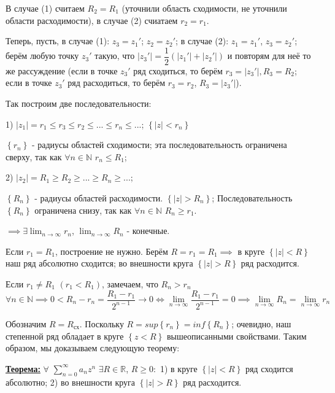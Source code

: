 \documentclass[a4paper, 12pt]{article}
\begin{document}
  \quad В случае (1) считаем $R_2 = R_1$ (уточнили область сходимости, не уточнили области расходимости), в случае (2) счиатаем $r_2 = r_1$. 

  \quad Теперь, пусть, в случае (1): $z_3 = z_1 '$; $z_2 = z_2 '$; в случае (2): $z_1 = z_1 '$, $z_3 = z_2 '$; берём любую точку $z_3 '$ такую, что $|z_3 '| = \dfrac{1}{2} \left( |z_1 '| + |z_2 '| \right)$ и повторям для неё то же рассуждение (если в точке $z_3 '$ ряд сходиться, то берём $r_3 = |z_3 '|, R_3 = R_2$; если в точке $z_3'$ ряд расходиться, то берём $r_3 = r_2$, $R_3 = |z_3 '|$). 
  
  \quad Так построим две последовательности:

  1) $|z_1| = r_1 \leq r_3 \leq r_2 \leq ... \leq r_n \leq ...$; $\left\{ |z| < r_n \right\}$

  $\left\{ r_n \right\}$ - радиусы областей сходимости; эта последовательность ограничена сверху, так как $\forall n \in \mathbb{N}$ $r_n \leq R_1$;

  2) $|z_2| = R_1 \geq R_2 \geq ... \geq R_n \geq ... $;

  $\left\{ R_n \right\}$ - радиусы областей расходимости. $\left\{|z| > R_n \right\}$; Последовательность $\left\{ R_n \right\}$ ограничена снизу, так как $\forall n \in \mathbb{N}$ $R_n \geq r_1$. 

  $\implies \exists \displaystyle\lim_{n \to \infty} r_n$, $\displaystyle\lim_{n \to \infty} R_n$ - конечные.
  
  \quad Если $r_1 = R_1$, построение не нужно. Берём $R = r_1 = R_1 \implies $ в круге $\left\{ |z| < R \right\}$ наш ряд абсолютно сходится; во внешности круга $\left\{ |z| > R \right\}$ ряд расходится. 

  \quad Если $r_1 \neq R_1$ $(r_1 < R_1)$, замечаем, что $R_n > r_n$ $\forall n \in \mathbb{N} \implies 0 < R_n - r_n = \dfrac{R_1 - r_1}{2^{n-1}} \to 0 \Leftrightarrow \lim\limits_{n \to \infty} \dfrac{R_1 - r_1}{2^{n-1}} = 0 \implies \lim\limits_{n \to \infty} R_n = \lim\limits_{n \to \infty} r_n $

  \quad Обозначим $R = R_{\text{сх}}$. Поскольку $R = sup \left\{ r_n \right\} = inf \left\{ R_n \right\}$; очевидно, наш степенной ряд обладает в круге $\left\{ z < R \right\}$ вышеописанными свойствами. Таким образом, мы доказываем следующую теорему:

  \quad \textbf{\underline{Теорема:}} $\displaystyle\forall$ $\sum\limits_{n=0}^{\infty} a_n z^n$ $\exists R \in \mathbb{R}$, $R \geq 0 :$ 1) в круге $\left\{ |z| < R \right\}$ ряд сходится абсолютно; 2) во внешности круга $\left\{ |z| > R \right\} $ ряд расходится. 
  
\end{document}
